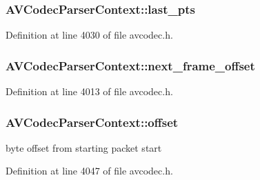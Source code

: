\subsubsection[{\texorpdfstring{last\+\_\+pts}{last_pts}}]{ A\+V\+Codec\+Parser\+Context\+::last\+\_\+pts}\hypertarget{struct_a_v_codec_parser_context_ae89a7517e6ae437a3658424e748ed980}{}\label{struct_a_v_codec_parser_context_ae89a7517e6ae437a3658424e748ed980}


Definition at line 4030 of file avcodec.\+h.

\subsubsection[{\texorpdfstring{next\+\_\+frame\+\_\+offset}{next_frame_offset}}]{ A\+V\+Codec\+Parser\+Context\+::next\+\_\+frame\+\_\+offset}\hypertarget{struct_a_v_codec_parser_context_ab4eda26dc96f26d2bb71b9a9c7d9a50c}{}\label{struct_a_v_codec_parser_context_ab4eda26dc96f26d2bb71b9a9c7d9a50c}


Definition at line 4013 of file avcodec.\+h.

\subsubsection[{\texorpdfstring{offset}{offset}}]{ A\+V\+Codec\+Parser\+Context\+::offset}\hypertarget{struct_a_v_codec_parser_context_af22fba8f2937d73db0ab5c9f9e985916}{}\label{struct_a_v_codec_parser_context_af22fba8f2937d73db0ab5c9f9e985916}


byte offset from starting packet start 



Definition at line 4047 of file avcodec.\+h.

